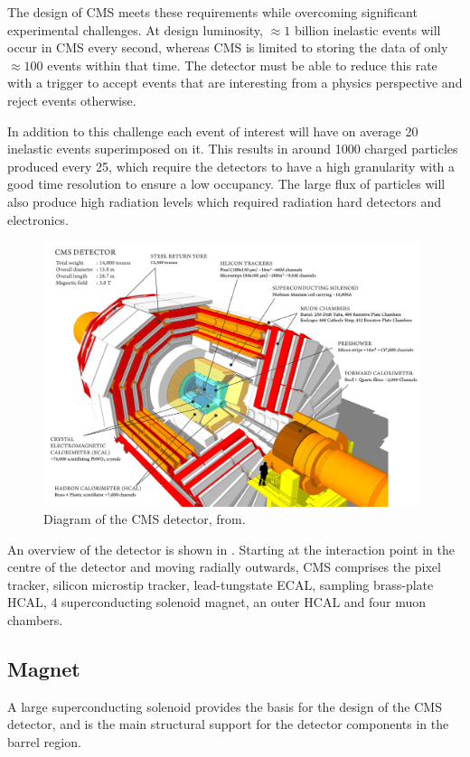 The design of CMS meets these requirements while overcoming significant
experimental challenges.  At design luminosity, $\approx 1 $ billion inelastic
events will occur in CMS every second, whereas CMS is limited to storing the
data of only $\approx 100 $ events within that time.  The detector must be able to
reduce this rate with a trigger to accept events that are interesting from a
physics perspective and reject events otherwise.

In addition to this challenge each event of interest will have on average 20
inelastic events superimposed on it. This results in around 1000 charged
particles produced every \unit{25}{\ns}, which require the detectors to
have a high granularity with a good time resolution to ensure a low occupancy.
The large flux of particles will also produce high radiation levels which 
required radiation hard detectors and electronics.

\begin{figure}[htbp]
  \centering
  \includegraphics[width=0.98\textwidth]{cms_su.png}
  \caption{Diagram of the CMS detector, from\cite{sketchup}.}
  \label{fig:CMSnc}
\end{figure}

An overview of the detector is shown in .  Starting at the
interaction point in the centre of the detector and moving radially outwards,
CMS comprises the pixel tracker, silicon microstip tracker, lead-tungstate ECAL,
sampling brass-plate HCAL, \unit{4}{\tesla} superconducting solenoid magnet, an
outer HCAL and four muon chambers.

\subsection{Magnet}
A large superconducting solenoid provides the basis for the design of the CMS
detector, and is the main structural support for the detector components in the
barrel region.

